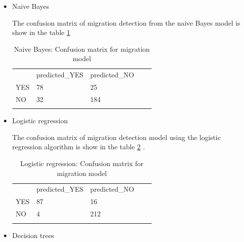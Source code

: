 \begin{itemize}
    \item Naive Bayes
    
    The confusion matrix of migration detection from the naive Bayes model is show in the table \ref{tab:confusionmatrix_migrationtweets_nb}

\begin{table}[]
\centering
\begin{tabular}{lllll}
\cline{1-3}
\multicolumn{1}{|l|}{}   & \multicolumn{1}{l|}{predicted\_YES} & \multicolumn{1}{l|}{predicted\_NO}  &  &  \\ \cline{1-3}
\multicolumn{1}{|l|}{YES} & \multicolumn{1}{l|}{78}  & \multicolumn{1}{l|}{25} &  &  \\ \cline{1-3}
\multicolumn{1}{|l|}{NO}   & \multicolumn{1}{l|}{32}  & \multicolumn{1}{l|}{184}  &  &  \\ \cline{1-3}
                            &                           &                           &  & 
\end{tabular}
\caption{Naive Bayes: Confusion matrix for migration model}
\label{tab:confusionmatrix_migrationtweets_nb}
\end{table}

    
    \item Logistic regression
    
    The confusion matrix of migration detection model using the logistic regression algorithm is show in the table \ref{tab:confusionmatrix_migrationtweets} .

\begin{table}[]
\centering
\begin{tabular}{lllll}
\cline{1-3}
\multicolumn{1}{|l|}{}   & \multicolumn{1}{l|}{predicted\_YES} & \multicolumn{1}{l|}{predicted\_NO}  &  &  \\ \cline{1-3}
\multicolumn{1}{|l|}{YES} & \multicolumn{1}{l|}{87}  & \multicolumn{1}{l|}{16} &  &  \\ \cline{1-3}
\multicolumn{1}{|l|}{NO}   & \multicolumn{1}{l|}{4}  & \multicolumn{1}{l|}{212}  &  &  \\ \cline{1-3}
                            &                           &                           &  & 
\end{tabular}
\caption{Logistic regression: Confusion matrix for migration model}
\label{tab:confusionmatrix_migrationtweets}
\end{table}

    \item Decision trees
    

\end{itemize}
